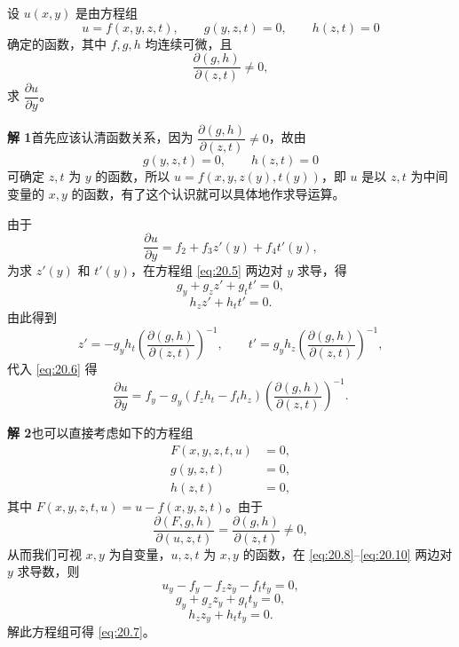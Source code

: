 \begin{xexample}[20.2.2]
设 $u(x,y)$ 是由方程组
\[
  u=f(x,y,z,t),\qquad g(y,z,t)=0,\qquad h(z,t)=0
\]
确定的函数，其中 $f,g,h$ 均连续可微，且
\[
  \frac{\partial(g,h)}{\partial(z,t)}\ne0,
\]
求 $\dfrac{\partial u}{\partial y}$。
\end{xexample}
\begin{xsolution}
\textbf{解 1}\quad 首先应该认清函数关系，因为 $\dfrac{\partial(g,h)}{\partial(z,t)}\ne0$，故由
\begin{equation}
  g(y,z,t)=0,\qquad h(z,t)=0
  \tag{20.5}
  \label{eq:20.5}
\end{equation}
可确定 $z,t$ 为 $y$ 的函数，所以 $u=f(x,y,z(y),t(y))$，即 $u$ 是以 $z,t$ 为中间变量的 $x,y$ 的函数，有了这个认识就可以具体地作求导运算。

由于
\begin{equation}
  \frac{\partial u}{\partial y}=f_2+f_3z'(y)+f_4t'(y),
  \tag{20.6}
  \label{eq:20.6}
\end{equation}
为求 $z'(y)$ 和 $t'(y)$，在方程组 \eqref{eq:20.5} 两边对 $y$ 求导，得
\[
  g_y+g_zz'+g_tt'=0,
\]
\[
  h_zz'+h_tt'=0.
\]
由此得到
\[
  z'=-g_yh_t\left(\frac{\partial(g,h)}{\partial(z,t)}\right)^{-1},
  \qquad
  t'=g_yh_z\left(\frac{\partial(g,h)}{\partial(z,t)}\right)^{-1},
\]
代入 \eqref{eq:20.6} 得
\begin{equation}
  \frac{\partial u}{\partial y}
  =f_y-g_y(f_zh_t-f_th_z)
  \left(\frac{\partial(g,h)}{\partial(z,t)}\right)^{-1}.
  \tag{20.7}
  \label{eq:20.7}
\end{equation}

\textbf{解 2}\quad 也可以直接考虑如下的方程组
\begin{align}
  F(x,y,z,t,u)&=0, \tag{20.8}\label{eq:20.8}\\
  g(y,z,t)&=0, \tag{20.9}\label{eq:20.9}\\
  h(z,t)&=0, \tag{20.10}\label{eq:20.10}
\end{align}
其中 $F(x,y,z,t,u)=u-f(x,y,z,t)$。由于
\[
  \frac{\partial(F,g,h)}{\partial(u,z,t)}
  =\frac{\partial(g,h)}{\partial(z,t)}\ne0,
\]
从而我们可视 $x,y$ 为自变量，$u,z,t$ 为 $x,y$ 的函数，在 \eqref{eq:20.8}--\eqref{eq:20.10} 两边对 $y$ 求导数，则
\[
  u_y-f_y-f_zz_y-f_tt_y=0,
\]
\[
  g_y+g_zz_y+g_tt_y=0,
\]
\[
  h_zz_y+h_tt_y=0.
\]
解此方程组可得 \eqref{eq:20.7}。
\end{xsolution}


